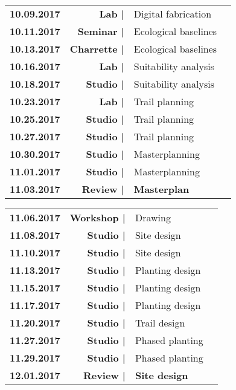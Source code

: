\documentclass[11pt,article,oneside]{memoir}
\begin{document}
\begin{table}[H]
\small
\begin{tabular}{l r @{\hskip 0.1cm} l @{\hskip 0.5cm} l}
%
\textbf{10.09.2017} & \textbf{Lab |} & Digital fabrication\\
\textbf{10.11.2017} & \textbf{Seminar |} & Ecological baselines\\
\textbf{10.13.2017} & \textbf{Charrette |} & Ecological baselines\\ %
%
\textbf{10.16.2017} & \textbf{Lab |} & Suitability analysis\\
\textbf{10.18.2017} & \textbf{Studio |} & Suitability analysis\\
%
\textbf{10.23.2017} & \textbf{Lab |} & Trail planning\\
\textbf{10.25.2017} & \textbf{Studio |} & Trail planning\\
\textbf{10.27.2017} & \textbf{Studio |} & Trail planning\\
%
\textbf{10.30.2017} & \textbf{Studio |} & Masterplanning\\
\textbf{11.01.2017} & \textbf{Studio |} & Masterplanning\\
\textbf{11.03.2017} & \textbf{Review |} & \textbf{Masterplan}\\
%
\end{tabular}
\end{table}

\begin{table}[H]
\small
\begin{tabular}{l r @{\hskip 0.1cm} l @{\hskip 0.5cm} l}
%
\textbf{11.06.2017} & \textbf{Workshop |} & Drawing\\
\textbf{11.08.2017} & \textbf{Studio |} & Site design\\
\textbf{11.10.2017} & \textbf{Studio |} & Site design\\
%
\textbf{11.13.2017} & \textbf{Studio |} & Planting design\\
\textbf{11.15.2017} & \textbf{Studio |} & Planting design\\
\textbf{11.17.2017} & \textbf{Studio |} & Planting design\\
%
\textbf{11.20.2017} & \textbf{Studio |} & Trail design\\ 
%
\textbf{11.27.2017} & \textbf{Studio |} & Phased planting\\
\textbf{11.29.2017} & \textbf{Studio |} & Phased planting\\
\textbf{12.01.2017} & \textbf{Review |} & \textbf{Site design}\\
%
\end{tabular}
\end{table}
\end{document}
